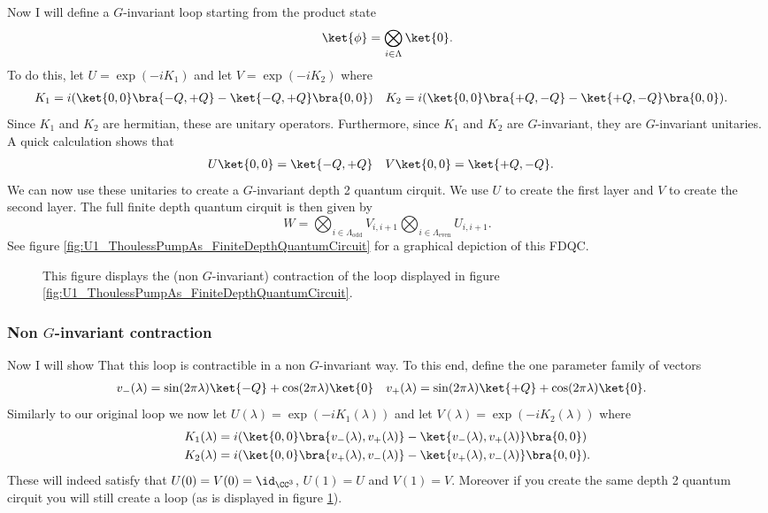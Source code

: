 Now I will define a $G$-invariant loop starting from the product state
\begin{equation}
\ket{\phi}=\bigotimes_{i\in\Lambda}\ket{0}.
\end{equation}
To do this, let $U=\exp(-iK_1)$ and let $V=\exp(-i K_2)$ where
\begin{align}
K_1&=i(\ket{0,0}\bra{-Q,+Q}-\ket{-Q,+Q}\bra{0,0})&K_2&=i(\ket{0,0}\bra{+Q,-Q}-\ket{+Q,-Q}\bra{0,0}).
\end{align}
Since $K_1$ and $K_2$ are hermitian, these are unitary operators. Furthermore, since $K_1$ and $K_2$ are $G$-invariant, they are $G$-invariant unitaries. A quick calculation shows that
\begin{align}
U\ket{0,0}&=\ket{-Q,+Q}&V \ket{0,0}&=\ket{+Q,-Q}.
\end{align}
We can now use these unitaries to create a $G$-invariant depth 2 quantum cirquit. We use $U$ to create the first layer and $V$ to create the second layer. The full finite depth quantum cirquit is then given by
\begin{equation}
W=\bigotimes_{i\in\Lambda_{\text{odd}}}V_{i,i+1}\bigotimes_{i\in\Lambda_{\text{even}}}U_{i,i+1}.
\end{equation}
See figure \ref{fig:U1_ThoulessPumpAs_FiniteDepthQuantumCircuit} for a graphical depiction of this FDQC.
\begin{figure}
	\centering
	\scalebox{0.78}{
		
	}
	\caption{This figure displays the (non $G$-invariant) contraction of the loop displayed in figure \ref{fig:U1_ThoulessPumpAs_FiniteDepthQuantumCircuit}.}
	\label{fig:U1_ThoulessPumpAs_FiniteDepthQuantumCircuit_Contraction}
\end{figure}
\subsubsection{Non $G$-invariant contraction}
Now I will show That this loop is contractible in a non $G$-invariant way. To this end, define the one parameter family of vectors
\begin{align}
v_-(\lambda)&=\sin(2\pi\lambda)\ket{-Q}+\cos(2\pi\lambda)\ket{0}&v_+(\lambda)&=\sin(2\pi\lambda)\ket{+Q}+\cos(2\pi\lambda)\ket{0}.
\end{align}
Similarly to our original loop we now let $U(\lambda)=\exp(-iK_1(\lambda))$ and let $V(\lambda)=\exp(-i K_2(\lambda))$ where
\begin{align}
K_1(\lambda)&=i(\ket{0,0}\bra{v_-(\lambda),v_+(\lambda)}-\ket{v_-(\lambda),v_+(\lambda)}\bra{0,0})\\
K_2(\lambda)&=i(\ket{0,0}\bra{v_+(\lambda),v_-(\lambda)}-\ket{v_+(\lambda),v_-(\lambda)}\bra{0,0}).
\end{align}
These will indeed satisfy that $U(0)=V(0)=\id_{\CC^3}$, $U(1)=U$ and $V(1)=V$. Moreover if you create the same depth 2 quantum cirquit you will still create a loop (as is displayed in figure \ref{fig:U1_ThoulessPumpAs_FiniteDepthQuantumCircuit_Contraction}).
